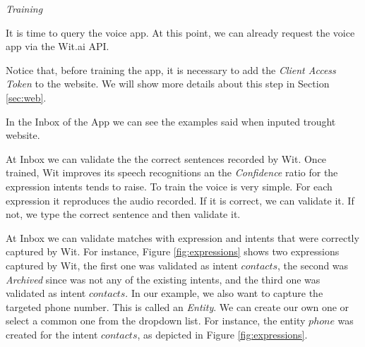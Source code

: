 \emph{Training}

It is time to query the voice app.
At this point, we can already request the voice app via the Wit.ai API.

Notice that, before training the app, it is necessary to add the \emph{Client Access Token} to the website.
We will show more details about this step in Section \ref{sec:web}.

In the Inbox of the App we can see the examples said when inputed trought website.


At Inbox we can validate the the correct sentences recorded by Wit.
Once trained, Wit improves its speech recognitions an the \emph{Confidence} ratio for the expression intents tends to raise.
To train the voice is very simple.
For each expression it reproduces the audio recorded.
If it is correct, we can validate it.
If not, we type the correct sentence and then validate it.



At Inbox we can validate matches with expression and intents that were correctly captured by Wit.
For instance, Figure \ref{fig:expressions} shows two expressions captured by Wit, the first one was validated as intent $contacts$, the second was \emph{Archived} since was not any of the existing intents, and the third one was validated as intent $contacts$.
In our example, we also want to capture the targeted phone number.
This is called an \emph{Entity}. 
We can create our own one or select a common one from the dropdown list. 
For instance, the entity $phone$ was created for the intent $contacts$, as depicted in Figure \ref{fig:expressions}.


